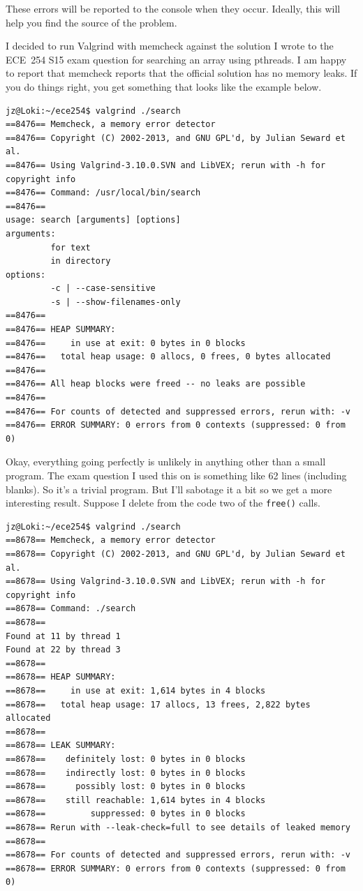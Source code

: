 \documentclass[a4paper]{report}
\begin{document}
These errors will be reported to the console when they occur. Ideally, this will help you find the source of the problem.

I decided to run Valgrind with memcheck against the solution I wrote to the ECE~254 S15 exam question for searching an array using pthreads. I am happy to report that memcheck reports that the official solution has no memory leaks. If you do things right, you get something that looks like the example below.
\begin{lstlisting}
jz@Loki:~/ece254$ valgrind ./search
==8476== Memcheck, a memory error detector
==8476== Copyright (C) 2002-2013, and GNU GPL'd, by Julian Seward et al.
==8476== Using Valgrind-3.10.0.SVN and LibVEX; rerun with -h for copyright info
==8476== Command: /usr/local/bin/search
==8476== 
usage: search [arguments] [options]
arguments:
         for text
         in directory
options:
         -c | --case-sensitive
         -s | --show-filenames-only
==8476== 
==8476== HEAP SUMMARY:
==8476==     in use at exit: 0 bytes in 0 blocks
==8476==   total heap usage: 0 allocs, 0 frees, 0 bytes allocated
==8476== 
==8476== All heap blocks were freed -- no leaks are possible
==8476== 
==8476== For counts of detected and suppressed errors, rerun with: -v
==8476== ERROR SUMMARY: 0 errors from 0 contexts (suppressed: 0 from 0)
\end{lstlisting}

Okay, everything going perfectly is unlikely in anything other than a small program. The exam question I used this on is something like 62 lines (including blanks). So it's a trivial program. But I'll sabotage it a bit so we get a more interesting result. Suppose I delete from the code two of the \texttt{free()} calls.

\begin{lstlisting}
jz@Loki:~/ece254$ valgrind ./search 
==8678== Memcheck, a memory error detector
==8678== Copyright (C) 2002-2013, and GNU GPL'd, by Julian Seward et al.
==8678== Using Valgrind-3.10.0.SVN and LibVEX; rerun with -h for copyright info
==8678== Command: ./search
==8678== 
Found at 11 by thread 1 
Found at 22 by thread 3 
==8678== 
==8678== HEAP SUMMARY:
==8678==     in use at exit: 1,614 bytes in 4 blocks
==8678==   total heap usage: 17 allocs, 13 frees, 2,822 bytes allocated
==8678== 
==8678== LEAK SUMMARY:
==8678==    definitely lost: 0 bytes in 0 blocks
==8678==    indirectly lost: 0 bytes in 0 blocks
==8678==      possibly lost: 0 bytes in 0 blocks
==8678==    still reachable: 1,614 bytes in 4 blocks
==8678==         suppressed: 0 bytes in 0 blocks
==8678== Rerun with --leak-check=full to see details of leaked memory
==8678== 
==8678== For counts of detected and suppressed errors, rerun with: -v
==8678== ERROR SUMMARY: 0 errors from 0 contexts (suppressed: 0 from 0)
\end{lstlisting}
\end{document}
